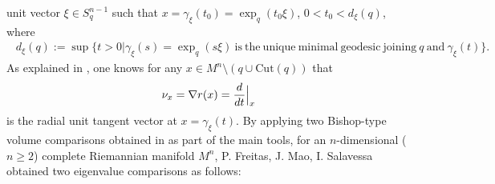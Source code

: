 \documentclass[12pt]{article}
\begin{document}
 unit vector $\xi\in S_{q}^{n-1}$ such that
 $x=\gamma_{\xi}(t_0)=\exp_{q}(t_{0}\xi)$, $0<t_{0}<d_{\xi}(q)$,
 where
 \begin{eqnarray*}
~~d_{\xi}(q):=\sup\{t>0|\gamma_{\xi}(s)=\exp_{q}(s\xi)~\mathrm{is~the~unique~minimal~geodesic~joining}~q~\mathrm{and}~\gamma_{\xi}(t)\}.
 \end{eqnarray*}
As explained in \cite[Section 2]{FMI}, one knows  for any $x\in
 M^{n}\setminus\left({q}\cup\mathrm{Cut}(q)\right)$ that
\begin{eqnarray*}
\nu_{x}=\nabla r(x)=\frac{d}{dt}\Big{|}_{x}
\end{eqnarray*}
is the radial unit tangent vector at $x=\gamma_{\xi}(t)$. By
applying two Bishop-type volume comparisons obtained in
\cite[Corollary 3.5 and Theorem
 4.2]{FMI} as part of the main tools, for an $n$-dimensional ($n\geq2$) complete Riemannian manifold $M^{n}$, P. Freitas,
J. Mao, I. Salavessa \cite[Theorems 3.6 and 4.4]{FMI} obtained two
eigenvalue comparisons as follows:
\end{document}
